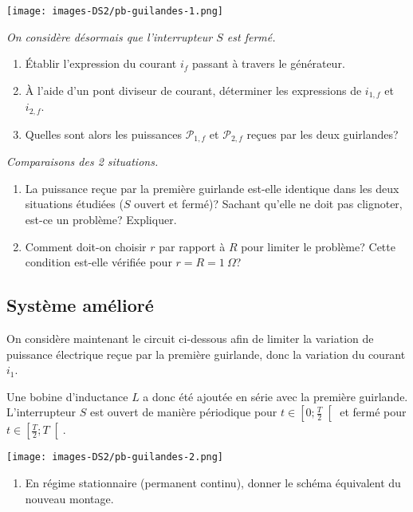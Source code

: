 \texttt{[image: images-DS2/pb-guilandes-1.png]}

\emph{On considère désormais que l'interrupteur \(S\) est fermé.}

\begin{enumerate}
\def\labelenumi{\arabic{enumi}.}
\setcounter{enumi}{2}
\item
  Établir l'expression du courant \(i_f\) passant à travers le
  générateur.
\item
  À l'aide d'un pont diviseur de courant, déterminer les expressions de
  \(i_{1,f}\) et \(i_{2,f}\).
\item
  Quelles sont alors les puissances \(\mathcal{P}_{1,f}\) et
  \(\mathcal{P}_{2,f}\) reçues par les deux guirlandes?
\end{enumerate}

\emph{Comparaisons des 2 situations.}

\begin{enumerate}
\def\labelenumi{\arabic{enumi}.}
\setcounter{enumi}{5}
\item
  La puissance reçue par la première guirlande est-elle identique dans
  les deux situations étudiées (\(S\) ouvert et fermé)? Sachant qu'elle
  ne doit pas clignoter, est-ce un problème? Expliquer.
\item
  Comment doit-on choisir \(r\) par rapport à \(R\) pour limiter le
  problème? Cette condition est-elle vérifiée pour
  \(r = R = 1\ \Omega\)?
\end{enumerate}

\hypertarget{systuxe8me-amuxe9lioruxe9}{%
\subsection*{Système amélioré}\label{systuxe8me-amuxe9lioruxe9}}

On considère maintenant le circuit ci-dessous afin de limiter la
variation de puissance électrique reçue par la première guirlande, donc
la variation du courant \(i_1\).

Une bobine d'inductance \(L\) a donc été ajoutée en série avec la
première guirlande. L'interrupteur \(S\) est ouvert de manière
périodique pour \(t \in \left[0 ; \frac{T}{2} \right[\) et fermé pour
\(t \in \left[ \frac{T}{2} ; T\right[\).

\texttt{[image: images-DS2/pb-guilandes-2.png]}

\begin{enumerate}
\def\labelenumi{\arabic{enumi}.}
\setcounter{enumi}{7}
\tightlist
\item
  En régime stationnaire (permanent continu), donner le schéma
  équivalent du nouveau montage.
\end{enumerate}

